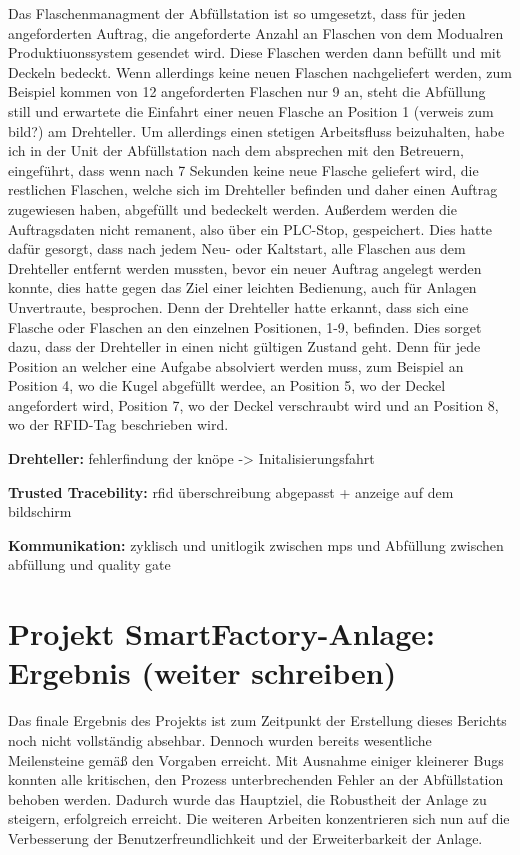 Das Flaschenmanagment der Abfüllstation ist so umgesetzt, dass für jeden angeforderten Auftrag, die angeforderte Anzahl an Flaschen von dem Modualren 
Produktiuonssystem gesendet wird. Diese Flaschen werden dann befüllt und mit Deckeln bedeckt. Wenn allerdings keine neuen Flaschen nachgeliefert werden, zum 
Beispiel kommen von 12 angeforderten Flaschen nur 9 an, steht die Abfüllung still und erwartete die Einfahrt einer neuen Flasche an Position 1 (verweis zum
bild?) am Drehteller. Um allerdings einen stetigen Arbeitsfluss beizuhalten, habe ich in der Unit der Abfüllstation nach dem absprechen mit den Betreuern, 
eingeführt, dass wenn nach 7 Sekunden keine neue Flasche geliefert wird, die restlichen Flaschen, welche sich im Drehteller befinden und daher einen Auftrag
zugewiesen haben, abgefüllt und bedeckelt werden. 
Außerdem werden die Auftragsdaten nicht remanent, also über ein PLC-Stop, gespeichert. Dies hatte dafür gesorgt, dass nach jedem Neu- oder Kaltstart, alle 
Flaschen aus dem Drehteller entfernt werden mussten, bevor ein neuer Auftrag angelegt werden konnte, dies hatte gegen das Ziel einer leichten Bedienung, auch für
Anlagen Unvertraute, besprochen. Denn der Drehteller hatte erkannt, dass sich eine Flasche oder Flaschen an den einzelnen Positionen, 1-9, befinden. 
Dies sorget dazu, dass der Drehteller in einen nicht gültigen Zustand geht. Denn für jede Position an welcher eine Aufgabe absolviert werden muss, 
zum Beispiel an Position 4, wo die Kugel abgefüllt werdee, an Position 5, wo der Deckel angefordert wird, Position 7, wo der Deckel verschraubt wird und an
Position 8, wo der RFID-Tag beschrieben wird.

\textbf{Drehteller:} 
fehlerfindung der knöpe -> Initalisierungsfahrt 

\textbf{Trusted Tracebility:} 
rfid überschreibung abgepasst + anzeige auf dem bildschirm 

\textbf{Kommunikation:} 
zyklisch und unitlogik zwischen mps und Abfüllung 
zwischen abfüllung und quality gate 

\section{Projekt SmartFactory-Anlage: Ergebnis (weiter schreiben)}

Das finale Ergebnis des Projekts ist zum Zeitpunkt der Erstellung dieses Berichts noch nicht vollständig absehbar. Dennoch wurden bereits 
wesentliche Meilensteine gemäß den Vorgaben erreicht. Mit Ausnahme einiger kleinerer Bugs konnten alle kritischen, den Prozess unterbrechenden 
Fehler an der Abfüllstation behoben werden. Dadurch wurde das Hauptziel, die Robustheit der Anlage zu steigern, erfolgreich erreicht. Die 
weiteren Arbeiten konzentrieren sich nun auf die Verbesserung der Benutzerfreundlichkeit und der Erweiterbarkeit der Anlage.

